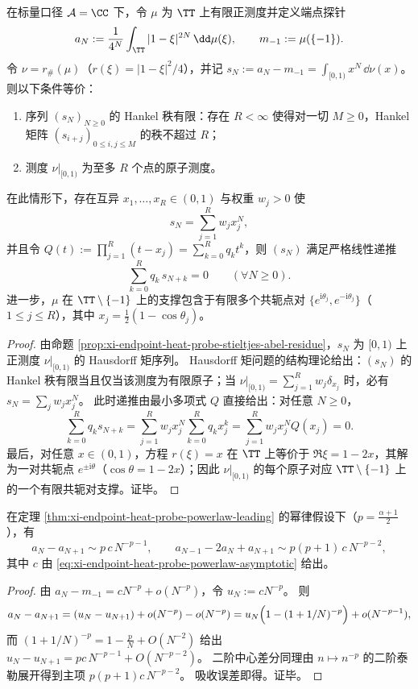 \begin{theorem}\label{thm:xi-endpoint-probe-finite-hankel-rank-finite-conjugate-pairs}
在标量口径 \(\mathcal{A}=\CC\) 下，令 \(\mu\) 为 \(\TT\) 上有限正测度并定义端点探针
\[
a_N:=\frac{1}{4^N}\int_{\TT}|1-\xi|^{2N}\,\dd\mu(\xi),
\qquad
m_{-1}:=\mu(\{-1\}).
\]
令 \(\nu=r_\#(\mu)\)（\(r(\xi)=|1-\xi|^2/4\)），并记 \(s_N:=a_N-m_{-1}=\int_{[0,1)}x^N\,\dd\nu(x)\)。
则以下条件等价：
\begin{enumerate}
  \item 序列 \((s_N)_{N\ge 0}\) 的 Hankel 秩有限：存在 \(R<\infty\) 使得对一切 \(M\ge 0\)，Hankel 矩阵 \((s_{i+j})_{0\le i,j\le M}\) 的秩不超过 \(R\)；
  \item 测度 \(\nu\big|_{[0,1)}\) 为至多 \(R\) 个点的原子测度。
\end{enumerate}
在此情形下，存在互异 \(x_1,\dots,x_R\in(0,1)\) 与权重 \(w_j>0\) 使
\[
s_N=\sum_{j=1}^{R}w_j x_j^N,
\]
并且令
\(
Q(t):=\prod_{j=1}^{R}(t-x_j)=\sum_{k=0}^{R}q_k t^k
\)，则 \((s_N)\) 满足严格线性递推
\[
\sum_{k=0}^{R}q_k\,s_{N+k}=0\qquad(\forall N\ge 0).
\]
进一步，\(\mu\) 在 \(\TT\setminus\{-1\}\) 上的支撑包含于有限多个共轭点对 \(\{e^{\mathrm{i}\theta_j},e^{-\mathrm{i}\theta_j}\}\)（\(1\le j\le R\)），其中 \(x_j=\frac12(1-\cos\theta_j)\)。
\end{theorem}
\begin{proof}
由命题 \ref{prop:xi-endpoint-heat-probe-stieltjes-abel-residue}，\(s_N\) 为 \([0,1)\) 上正测度 \(\nu\big|_{[0,1)}\) 的 Hausdorff 矩序列。
Hausdorff 矩问题的结构理论给出：\((s_N)\) 的 Hankel 秩有限当且仅当该测度为有限原子；当
\(
\nu\big|_{[0,1)}=\sum_{j=1}^{R}w_j\delta_{x_j}
\)
时，必有 \(s_N=\sum_j w_jx_j^N\)。
此时递推由最小多项式 \(Q\) 直接给出：对任意 \(N\ge 0\)，
\[
\sum_{k=0}^{R}q_k s_{N+k}
=\sum_{j=1}^{R}w_j x_j^N\sum_{k=0}^{R}q_k x_j^k
=\sum_{j=1}^{R}w_j x_j^N Q(x_j)=0.
\]
最后，对任意 \(x\in(0,1)\)，方程 \(r(\xi)=x\) 在 \(\TT\) 上等价于 \(\Re\xi=1-2x\)，其解为一对共轭点 \(e^{\pm\mathrm{i}\theta}\)（\(\cos\theta=1-2x\)）；因此 \(\nu\big|_{[0,1)}\) 的每个原子对应 \(\TT\setminus\{-1\}\) 上的一个有限共轭对支撑。证毕。
\end{proof}

\begin{proposition}[幂律情形的纯差分主项]\label{prop:xi-endpoint-heat-probe-powerlaw-differences}
在定理 \ref{thm:xi-endpoint-heat-probe-powerlaw-leading} 的幂律假设下（\(p=\tfrac{\alpha+1}{2}\)），有
\[
a_N-a_{N+1}\sim p\,c\,N^{-p-1},
\qquad
a_{N-1}-2a_N+a_{N+1}\sim p(p+1)\,c\,N^{-p-2},
\]
其中 \(c\) 由 \eqref{eq:xi-endpoint-heat-probe-powerlaw-asymptotic} 给出。
\end{proposition}
\begin{proof}
由 \(a_N-m_{-1}=cN^{-p}+o(N^{-p})\)，令 \(u_N:=cN^{-p}\)。
则
\[
a_N-a_{N+1}=(u_N-u_{N+1})+o(N^{-p})-o(N^{-p})
=u_N\Bigl(1-(1+1/N)^{-p}\Bigr)+o(N^{-p-1}),
\]
而 \((1+1/N)^{-p}=1-\frac{p}{N}+O(N^{-2})\) 给出 \(u_N-u_{N+1}=pc\,N^{-p-1}+O(N^{-p-2})\)。
二阶中心差分同理由 \(n\mapsto n^{-p}\) 的二阶泰勒展开得到主项 \(p(p+1)c\,N^{-p-2}\)。
吸收误差即得。证毕。
\end{proof}

\endinput

